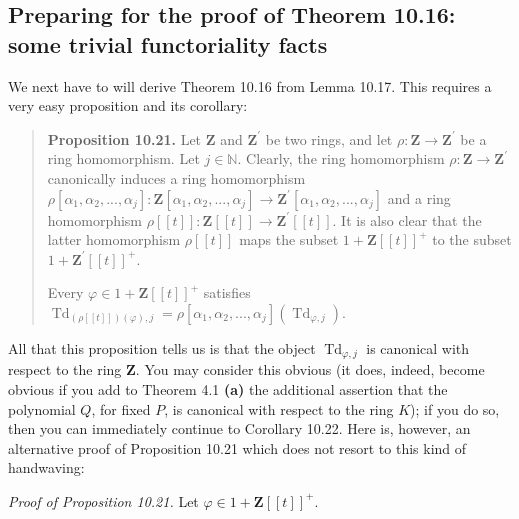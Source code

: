 \documentclass[numbers=enddot,12pt,final,onecolumn,notitlepage]{scrartcl}%
\begin{document}
\subsection{Preparing for the proof of Theorem 10.16: some trivial
functoriality facts}

We next have to will derive Theorem 10.16 from Lemma 10.17. This requires a
very easy proposition and its corollary:

\begin{quote}
\textbf{Proposition 10.21.} Let $\mathbf{Z}$ and $\mathbf{Z}^{\prime}$ be two
rings, and let $\rho:\mathbf{Z}\rightarrow\mathbf{Z}^{\prime}$ be a ring
homomorphism. Let $j\in\mathbb{N}$. Clearly, the ring homomorphism
$\rho:\mathbf{Z}\rightarrow\mathbf{Z}^{\prime}$ canonically induces a ring
homomorphism $\rho\left[  \alpha_{1},\alpha_{2},...,\alpha_{j}\right]
:\mathbf{Z}\left[  \alpha_{1},\alpha_{2},...,\alpha_{j}\right]  \rightarrow
\mathbf{Z}^{\prime}\left[  \alpha_{1},\alpha_{2},...,\alpha_{j}\right]  $ and
a ring homomorphism $\rho\left[  \left[  t\right]  \right]  :\mathbf{Z}\left[
\left[  t\right]  \right]  \rightarrow\mathbf{Z}^{\prime}\left[  \left[
t\right]  \right]  $. It is also clear that the latter homomorphism
$\rho\left[  \left[  t\right]  \right]  $ maps the subset $1+\mathbf{Z}\left[
\left[  t\right]  \right]  ^{+}$ to the subset $1+\mathbf{Z}^{\prime}\left[
\left[  t\right]  \right]  ^{+}$.

Every $\varphi\in1+\mathbf{Z}\left[  \left[  t\right]  \right]  ^{+}$
satisfies $\operatorname*{Td}\nolimits_{\left(  \rho\left[  \left[  t\right]
\right]  \right)  \left(  \varphi\right)  ,j}=\rho\left[  \alpha_{1}%
,\alpha_{2},...,\alpha_{j}\right]  \left(  \operatorname*{Td}%
\nolimits_{\varphi,j}\right)  $.
\end{quote}

All that this proposition tells us is that the object $\operatorname*{Td}%
\nolimits_{\varphi,j}$ is canonical with respect to the ring $\mathbf{Z}$. You
may consider this obvious (it does, indeed, become obvious if you add to
Theorem 4.1 \textbf{(a)} the additional assertion that the polynomial $Q$, for
fixed $P$, is canonical with respect to the ring $K$); if you do so, then you
can immediately continue to Corollary 10.22. Here is, however, an alternative
proof of Proposition 10.21 which does not resort to this kind of handwaving:

\textit{Proof of Proposition 10.21.} Let $\varphi\in1+\mathbf{Z}\left[
\left[  t\right]  \right]  ^{+}$.
\end{document}

